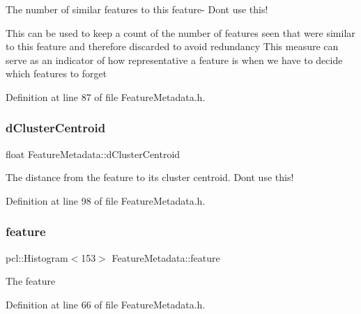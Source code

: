 The number of similar features to this feature-\/ Don\textquotesingle{}t use this!

This can be used to keep a count of the number of features seen that were similar to this feature and therefore discarded to avoid redundancy This measure can serve as an indicator of how representative a feature is when we have to decide which features to forget 

Definition at line 87 of file Feature\+Metadata.\+h.

\mbox{\label{class_feature_metadata_ab8a28f696d38b7bdd3aeef92a3453bcf}} 
\subsubsection{\texorpdfstring{d\+Cluster\+Centroid}{dClusterCentroid}}
{\footnotesize\ttfamily float Feature\+Metadata\+::d\+Cluster\+Centroid\hspace{0.3cm}{\ttfamily [protected]}}

The distance from the feature to its cluster centroid. Don\textquotesingle{}t use this! 

Definition at line 98 of file Feature\+Metadata.\+h.

\mbox{\label{class_feature_metadata_a0b288799d230ccf13d34efd60165ebb6}} 
\subsubsection{\texorpdfstring{feature}{feature}}
{\footnotesize\ttfamily pcl\+::\+Histogram$<$153$>$ Feature\+Metadata\+::feature\hspace{0.3cm}{\ttfamily [protected]}}

The feature 

Definition at line 66 of file Feature\+Metadata.\+h.

\mbox{\label{class_feature_metadata_acb096e77efd9a31c51b99682160324ce}} 
